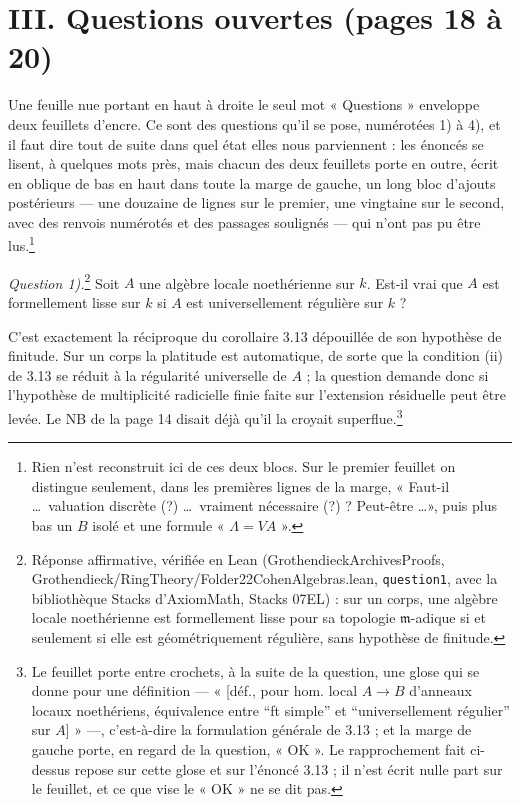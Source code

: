\documentclass[11pt,a4paper]{article}
\begin{document}
\section*{III. Questions ouvertes (pages 18 à 20)}

Une feuille nue portant en haut à droite le seul mot « Questions » enveloppe
deux feuillets d'encre. Ce sont des questions qu'il se pose, numérotées 1) à
4), et il faut dire tout de suite dans quel état elles nous parviennent : les
énoncés se lisent, à quelques mots près, mais chacun des deux feuillets porte
en outre, écrit en oblique de bas en haut dans toute la marge de gauche, un
long bloc d'ajouts postérieurs — une douzaine de lignes sur le premier, une
vingtaine sur le second, avec des renvois numérotés et des passages soulignés —
qui n'ont pas pu être lus.\footnote{Rien n'est reconstruit ici de ces deux
blocs. Sur le premier feuillet on distingue seulement, dans les premières
lignes de la marge, « Faut-il \ldots\ valuation discrète (?) \ldots\ vraiment
nécessaire (?) ? Peut-être \ldots », puis plus bas un $B$ isolé et une formule
« $\Lambda = VA$ ».}

\emph{Question 1).}\footnote{Réponse affirmative, vérifiée en Lean
(GrothendieckArchivesProofs, Grothendieck/RingTheory/Folder22CohenAlgebras.lean,
\texttt{question1}, avec la bibliothèque Stacks d'AxiomMath, Stacks 07EL) : sur un corps, une algèbre locale
noethérienne est formellement lisse pour sa topologie $\mathfrak{m}$-adique si et
seulement si elle est géométriquement régulière, sans hypothèse de finitude.} Soit $A$ une algèbre locale noethérienne sur $k$. Est-il
vrai que $A$ est formellement lisse sur $k$ si $A$ est universellement
régulière sur $k$ ?

C'est exactement la réciproque du corollaire 3.13 dépouillée de son hypothèse
de finitude. Sur un corps la platitude est automatique, de sorte que la
condition (ii) de 3.13 se réduit à la régularité universelle de $A$ ; la
question demande donc si l'hypothèse de multiplicité radicielle finie faite sur
l'extension résiduelle peut être levée. Le NB de la page 14 disait déjà qu'il
la croyait superflue.\footnote{Le feuillet porte entre crochets, à la suite de
la question, une glose qui se donne pour une définition — « [déf., pour hom.
local $A \to B$ d'anneaux locaux noethériens, équivalence entre “ft simple” et
“universellement régulier” sur $A$] » —, c'est-à-dire la formulation générale
de 3.13 ; et la marge de gauche porte, en regard de la question, « OK ». Le
rapprochement fait ci-dessus repose sur cette glose et sur l'énoncé 3.13 ; il
n'est écrit nulle part sur le feuillet, et ce que vise le « OK » ne se dit
pas.}
\end{document}
